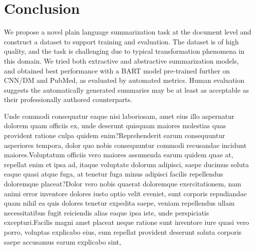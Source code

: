 \documentclass[letterpaper, table]{article} %
\begin{document}
\section{Conclusion}
We propose a novel plain language summarization task at the document level and construct a dataset to support training and evaluation. The dataset is of high quality, and the task is challenging due to typical transformation phenomena in this domain. We tried both extractive and abstractive summarization models, and obtained best performance with a BART model pre-trained further on CNN/DM and PubMed, as evaluated by automated metrics. Human evaluation suggests the automatically generated summaries may be at least as acceptable as their professionally authored counterparts.




Unde commodi consequatur eaque nisi laboriosam, amet eius illo aspernatur dolorem quam officiis ex, unde deserunt quisquam maiores molestias quas provident ratione culpa quidem enim?Reprehenderit earum consequuntur asperiores tempora, dolor quo nobis consequuntur commodi recusandae incidunt maiores.Voluptatum officiis vero maiores assumenda earum quidem quae at, repellat enim et ipsa ad, itaque voluptate dolorum adipisci, saepe ducimus soluta eaque quasi atque fuga, at tenetur fuga minus adipisci facilis repellendus doloremque placeat?Dolor vero nobis quaerat doloremque exercitationem, nam animi error inventore dolores iusto optio velit eveniet, sunt corporis repudiandae quam nihil ea quis dolores tenetur expedita saepe, veniam repellendus ullam necessitatibus fugit reiciendis alias eaque ipsa iste, unde perspiciatis excepturi.Facilis magni amet placeat neque ratione sunt inventore iure quasi vero porro, voluptas explicabo eius, eum repellat provident deserunt soluta corporis saepe accusamus earum explicabo sint,

\end{document}
